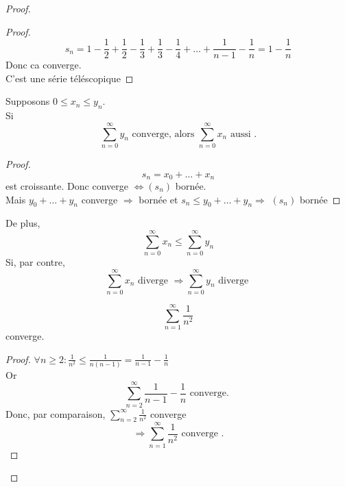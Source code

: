 \documentclass[../main.tex]{subfiles}
\begin{document}
\begin{proof}
\begin{proof}
\[ 
s_n = 1- \frac{1}{2} + \frac{1}{2} -\frac{1}{3} + \frac{1}{3} - \frac{1}{4} + \ldots + \frac{1}{n-1} - \frac{1}{n} = 1 - \frac{1}{n}
\]
Donc ca converge.\\
C'est une série téléscopique

\end{proof}
\begin{propo}
Supposons  $0 \leq x_n \leq y_n$.\\
Si  
\[ 
\sum_{n=0}^{ \infty} y_n \text{ converge, alors } \sum_{n=0}^{ \infty} x_n \text{ aussi } .
\]
\end{propo}
\begin{proof}
\[ 
s_n = x_0 + \ldots + x_n
\]
est croissante. Donc converge $\iff ( s_n)$ bornée.\\
Mais $y_0 + \ldots + y_n$ converge $\Rightarrow$ bornée et
$s_n \leq y_0 + \ldots + y_n \Rightarrow $ $(s_n)$ bornée
\end{proof}
\begin{rmq}
De plus, 
\[ 
\sum_{n=0}^{ \infty} x_n \leq \sum_{n=0}^{ \infty} y_n
\]
Si, par contre, 
\[ 
\sum_{n=0}^{ \infty} x_n \text{ diverge } \Rightarrow \sum_{n=0}^{ \infty} y_n \text{ diverge } 
\]
\end{rmq}
\begin{crly}
\[ 
\sum_{n=1}^{ \infty} \frac{1}{n^{2}}
\]
converge.

\end{crly}
\begin{proof}
	$\forall n \geq 2: \frac{1}{n^{2}} \leq \frac{1}{n(n-1)} = \frac{1}{n-1} - \frac{1}{n}$\\
	Or 
	\[ 
	\sum_{n=2}^{ \infty} \frac{1}{n-1} - \frac{1}{n} \text{ converge. } 
	\]
	Donc, par comparaison, $ \sum_{n=2}^{ \infty} \frac{1}{n^{2}}$ converge
	\[ 
\Rightarrow \sum_{n=1}^{ \infty} \frac{1}{n^{2}} \text{ converge } .
	\]
	
\end{proof}












\end{proof}
\end{document}
